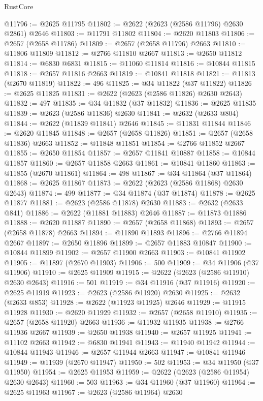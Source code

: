 \begin{lexlean}{RustCore}
\begin{coremodule}
@11796 := @2625 @11795
@11802 := @2622 (@2623 (@2586 @11796) @2630 @2861) @2646
@11803 := @11791 @11802
@11804 := @2620 @11803
@11806 := @2657 (@2658 @11786)
@11809 := @2657 (@2658 @11796) @2663
@11810 := @11806 @11809
@11812 := @2766 @11810 @2667
@11813 := @2650 @11812
@11814 := @6830 @6831
@11815 := @11060 @11814
@11816 := @10844 @11815
@11818 := @2657 @11816 @2663
@11819 := @10841 @11818
@11821 := @11813 (@2670 @11819)
@11822 := 496
@11825 := @34 @11822 (@37 @11822)
@11826 := @2625 @11825
@11831 := @2622 (@2623 (@2586 @11826) @2630 @2643)
@11832 := 497
@11835 := @34 @11832 (@37 @11832)
@11836 := @2625 @11835
@11839 := @2623 (@2586 @11836) @2630
@11841 := @2632 (@2633 @804)
@11844 := @2622 (@11839 @11841) @2646
@11845 := @11831 @11844
@11846 := @2620 @11845
@11848 := @2657 (@2658 @11826)
@11851 := @2657 (@2658 @11836) @2663
@11852 := @11848 @11851
@11854 := @2766 @11852 @2667
@11855 := @2650 @11854
@11857 := @2657 @11841 @10887
@11858 := @10844 @11857
@11860 := @2657 @11858 @2663
@11861 := @10841 @11860
@11863 := @11855 (@2670 @11861)
@11864 := 498
@11867 := @34 @11864 (@37 @11864)
@11868 := @2625 @11867
@11873 := @2622 (@2623 (@2586 @11868) @2630 @2643)
@11874 := 499
@11877 := @34 @11874 (@37 @11874)
@11878 := @2625 @11877
@11881 := @2623 (@2586 @11878) @2630
@11883 := @2632 (@2633 @841)
@11886 := @2622 (@11881 @11883) @2646
@11887 := @11873 @11886
@11888 := @2620 @11887
@11890 := @2657 (@2658 @11868)
@11893 := @2657 (@2658 @11878) @2663
@11894 := @11890 @11893
@11896 := @2766 @11894 @2667
@11897 := @2650 @11896
@11899 := @2657 @11883 @10847
@11900 := @10844 @11899
@11902 := @2657 @11900 @2663
@11903 := @10841 @11902
@11905 := @11897 (@2670 @11903)
@11906 := 500
@11909 := @34 @11906 (@37 @11906)
@11910 := @2625 @11909
@11915 := @2622 (@2623 (@2586 @11910) @2630 @2643)
@11916 := 501
@11919 := @34 @11916 (@37 @11916)
@11920 := @2625 @11919
@11923 := @2623 (@2586 @11920) @2630
@11925 := @2632 (@2633 @853)
@11928 := @2622 (@11923 @11925) @2646
@11929 := @11915 @11928
@11930 := @2620 @11929
@11932 := @2657 (@2658 @11910)
@11935 := @2657 (@2658 @11920) @2663
@11936 := @11932 @11935
@11938 := @2766 @11936 @2667
@11939 := @2650 @11938
@11940 := @2657 @11925
@11941 := @11102 @2663
@11942 := @6830 @11941
@11943 := @11940 @11942
@11944 := @10844 @11943
@11946 := @2657 @11944 @2663
@11947 := @10841 @11946
@11949 := @11939 (@2670 @11947)
@11950 := 502
@11953 := @34 @11950 (@37 @11950)
@11954 := @2625 @11953
@11959 := @2622 (@2623 (@2586 @11954) @2630 @2643)
@11960 := 503
@11963 := @34 @11960 (@37 @11960)
@11964 := @2625 @11963
@11967 := @2623 (@2586 @11964) @2630

\end{coremodule}
\end{lexlean}
